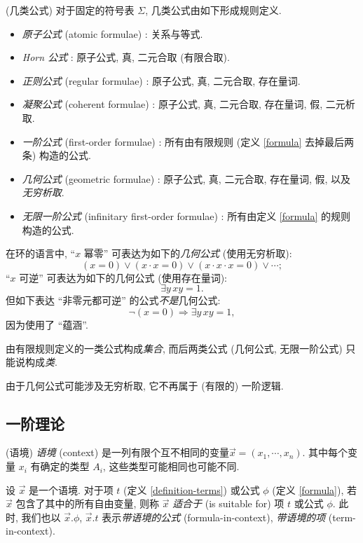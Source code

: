 \begin{definition}
	[label={kinds-of-formulae}]
	{(几类公式)}
	对于固定的符号表 $\Sigma$,
	几类公式由如下形成规则定义.
	\begin{itemize}
		\item \emph{原子公式} (atomic formulae) : 关系与等式.
		\item \emph{Horn 公式}\footnotemark{} : 原子公式, 真, 二元合取 (有限合取).
		\item \emph{正则公式} (regular formulae) : 原子公式, 真, 二元合取, 存在量词.
		\item \emph{凝聚公式} (coherent formulae) : 原子公式, 真, 二元合取, 存在量词, 假, 二元析取.
		\item \emph{一阶公式} (first-order formulae) : 所有由有限规则 (定义 \ref{formula} 去掉最后两条) 构造的公式.
		\item \emph{几何公式} (geometric formulae) : 原子公式, 真, 二元合取, 存在量词, 假, 以及\emph{无穷析取}.
		\item \emph{无限一阶公式} (infinitary first-order formulae) : 所有由定义 \ref{formula} 的规则构造的公式.
	\end{itemize}
\end{definition}

\begin{example}
	{}
	在环的语言中, ``$x$ 幂零'' 可表达为如下的\emph{几何公式} (使用无穷析取):
	$$
	(x=0)\lor (x\cdot x=0) \lor (x\cdot x\cdot x=0)\lor\cdots;
	$$
	``$x$ 可逆'' 可表达为如下的几何公式 (使用存在量词):
	$$
	\exists y\, xy= 1.
	$$
	但如下表达 ``非零元都可逆'' 的公式\emph{不是}几何公式:
	$$
	\neg(x=0) \Rightarrow \exists y\,xy=1,
	$$
	因为使用了 ``蕴涵''.
\end{example}

\begin{remark}
	{}
	由有限规则定义的一类公式构成\emph{集合}, 而后两类公式 (几何公式, 无限一阶公式) 只能说构成\emph{类}.
	
	由于几何公式可能涉及无穷析取, 它不再属于 (有限的) 一阶逻辑.
\end{remark}

\subsection{一阶理论}

\begin{definition}
	[label={definition-context}]
	{(语境)}
	\emph{语境} (context) 是一列有限个互不相同的变量\footnotemark $\vec x = (x_1,\cdots,x_n)$. 其中每个变量 $x_i$ 有确定的类型 $A_i$, 这些类型可能相同也可能不同.
	
	设 $\vec x$ 是一个语境. 对于项 $t$ (定义 \ref{definition-terms}) 或公式 $\phi$ (定义 \ref{formula}), 若 $\vec x$ 包含了其中的所有自由变量, 则称 $\vec x$ \emph{适合于} (is suitable for) 项 $t$ 或公式 $\phi$.
	此时, 我们也以 $\vec x.\phi$, $\vec x.t$ 表示\emph{带语境的公式} (formula-in-context), \emph{带语境的项} (term-in-context).
\end{definition}

